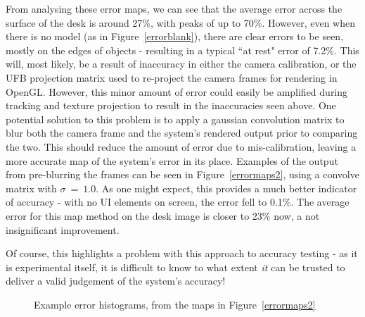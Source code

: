 \documentclass[a4paper,10pt]{article}
\begin{document}
From analysing these error maps, we can see that the average error across the surface of the desk is around 27\%, with peaks of up to 70\%. However, even when there is no model (as in Figure~\ref{errorblank}), there are clear errors to be seen, mostly on the edges of objects - resulting in a typical ``at rest" error of 7.2\%. This will, most likely, be a result of inaccuracy in either the camera calibration, or the UFB projection matrix used to re-project the camera frames for rendering in OpenGL. However, this minor amount of error could easily be amplified during tracking and texture projection to result in the inaccuracies seen above. One potential solution to this problem is to apply a gaussian convolution matrix to blur both the camera frame and the system's rendered output prior to comparing the two. This should reduce the amount of error due to mis-calibration, leaving a more accurate map of the system's error in its place. Examples of the output from pre-blurring the frames can be seen in Figure~\ref{errormaps2}, using a convolve matrix with $\sigma ~=~ 1.0$. As one might expect, this provides a much better indicator of accuracy - with no UI elements on screen, the error fell to 0.1\%. The average error for this map method on the desk image is closer to 23\% now, a not insignificant improvement.

Of course, this highlights a problem with this approach to accuracy testing - as it is experimental itself, it is difficult to know to what extent \textit{it} can be trusted to deliver a valid judgement of the system's accuracy!

\begin{figure}
  \begin{center}
    \hspace{10px}
  \end{center}
  \caption{Example error histograms, from the maps in Figure~\ref{errormaps2}}
  \label{histograms}
\end{figure} 
\end{document}
